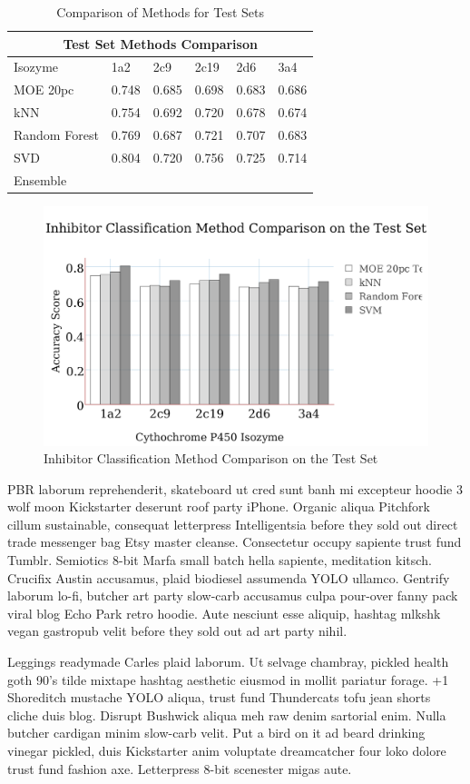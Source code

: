 \begin{table}[!h]
\begin{tabular}{|l|l|l|l|l|l|}
\hline
\multicolumn{6}{|c|}{Test Set Methods Comparison}     \\ \hline
Isozyme       & 1a2   & 2c9   & 2c19  & 2d6   & 3a4   \\ \hline
MOE 20pc      & 0.748 & 0.685 & 0.698 & 0.683 & 0.686 \\ \hline
kNN           & 0.754 & 0.692 & 0.720 & 0.678 & 0.674 \\ \hline
Random Forest & 0.769 & 0.687 & 0.721 & 0.707 & 0.683 \\ \hline
SVD           & 0.804 & 0.720 & 0.756 & 0.725 & 0.714 \\ \hline
Ensemble      &       &       &       &       &       \\ \hline
\end{tabular}
\caption{Comparison of Methods for Test Sets}
\end{table}

\begin{figure}[!h]
\includegraphics[width=1\textwidth]{../img/method_comparison_test_set.png}
\caption{Inhibitor Classification Method Comparison on the Test Set}
\end{figure}

PBR laborum reprehenderit, skateboard ut cred sunt banh mi excepteur hoodie 3 wolf moon Kickstarter deserunt roof party iPhone. Organic aliqua Pitchfork cillum sustainable, consequat letterpress Intelligentsia before they sold out direct trade messenger bag Etsy master cleanse. Consectetur occupy sapiente trust fund Tumblr. Semiotics 8-bit Marfa small batch hella sapiente, meditation kitsch. Crucifix Austin accusamus, plaid biodiesel assumenda YOLO ullamco. Gentrify laborum lo-fi, butcher art party slow-carb accusamus culpa pour-over fanny pack viral blog Echo Park retro hoodie. Aute nesciunt esse aliquip, hashtag mlkshk vegan gastropub velit before they sold out ad art party nihil.

Leggings readymade Carles plaid laborum. Ut selvage chambray, pickled health goth 90's tilde mixtape hashtag aesthetic eiusmod in mollit pariatur forage. +1 Shoreditch mustache YOLO aliqua, trust fund Thundercats tofu jean shorts cliche duis blog. Disrupt Bushwick aliqua meh raw denim sartorial enim. Nulla butcher cardigan minim slow-carb velit. Put a bird on it ad beard drinking vinegar pickled, duis Kickstarter anim voluptate dreamcatcher four loko dolore trust fund fashion axe. Letterpress 8-bit scenester migas aute.